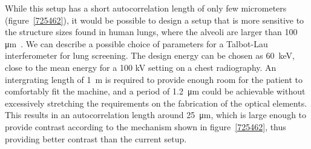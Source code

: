 While this setup has a short autocorrelation length of only few micrometers
(figure~\ref{725462}), it would be possible to design a setup that is more
sensitive to the structure sizes found in human lungs, where the alveoli are
larger than
100 μm~\cite{Ochs_2004}. We can describe a
possible choice of parameters for a Talbot-Lau interferometer for lung
screening. The design energy can be chosen as \SI{60}{\kilo\eV}, close to
the mean energy for a 100 kV setting on a chest
radiography. An intergrating length of \SI{1}{\meter} is required to provide
enough room for the patient to comfortably fit the machine,
and a period of \SI{1.2}{\micro\meter} could be achievable without
excessively stretching the requirements on the fabrication of the optical
elements. This results in an autocorrelation length around
\SI{25}{\micro\meter}, which is large enough to provide contrast according
to the mechanism shown in figure~\ref{725462}, thus providing better contrast than the
current setup.